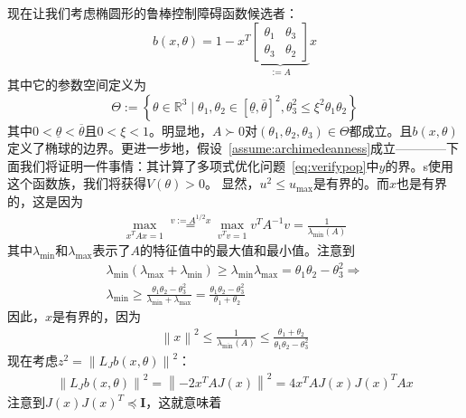 现在让我们考虑椭圆形的鲁棒控制障碍函数候选者：
\begin{equation}\label{eq:ellipsoidalcbf}
    b(x, \theta) = 1 - x^T \underbrace{
        \left[ \begin{matrix}
            \theta_1 & \theta_3 \\
            \theta_3 & \theta_2
        \end{matrix} \right]
    }_{:= A} x
\end{equation}
其中它的参数空间定义为
\begin{equation}\label{eq:ellipsoidalparam}
    \Theta := \left\{ 
        \theta \in \mathbb{R}^3 \mid \theta_1, \theta_2 \in [\underline{\theta}, \overline{\theta}]^2, \theta_3^2 \le \xi^2 \theta_1 \theta_2
     \right\}
\end{equation}
其中$0 < \underline{\theta} < \overline{\theta}$且$0 < \xi < 1$。明显地，$A \succ 0$对$(\theta_1, \theta_2, \theta_3) \in \Theta$都成立。且$b(x, \theta)$定义了椭球的边界。更进一步地，假设~\ref{assume:archimedeanness}成立————下面我们将证明一件事情：其计算了多项式优化问题~\eqref{eq:verifypop}中$y$的界。s使用这个函数族，我们将获得$V(\theta) > 0$。
显然，$u^2 \le u_{\max}$是有界的。而$x$也是有界的，这是因为
\begin{eqnarray}
  \max_{x^T A x = 1} \overset{v := A^{1/2}x}{=} 
  \max_{v^T v = 1} v^T A^{-1} v = \frac{1}{\lambda_{\min}(A)}
\end{eqnarray}
其中$\lambda_{\min}$和$\lambda_{\max}$表示了$A$的特征值中的最大值和最小值。注意到
\begin{eqnarray}
  \lambda_{\min} (\lambda_{\max} + \lambda_{\min}) \ge \lambda_{\min} \lambda_{\max} = \theta_1 \theta_2 - \theta_3^2 \Rightarrow \\
  \lambda_{\min} \ge \frac{
    \theta_1 \theta_2 - \theta_3^2
  }{
    \lambda_{\min} + \lambda_{\max}
  } = \frac{
    \theta_1 \theta_2 - \theta_3^2
  }{
    \theta_1 + \theta_2
  }
\end{eqnarray}
因此，$x$是有界的，因为
\begin{eqnarray}
  \left\lVert x \right\rVert^2 \le \frac{1}{\lambda_{\min}(A)} 
  \le \frac{
    \theta_1 + \theta_2
  }{
    \theta_1 \theta_2 - \theta_3^2
  }
\end{eqnarray}
现在考虑$z^2 = \left\lVert L_Jb(x, \theta) \right\rVert^2$：
\begin{eqnarray}
  \left\lVert L_Jb(x, \theta) \right\rVert^2 = 
  \left\lVert -2 x^T A J(x) \right\rVert^2 = 
  4 x^T A J(x)J(x)^T A x
\end{eqnarray}
注意到$J(x)J(x)^T \preceq \textbf{I}$，这就意味着
